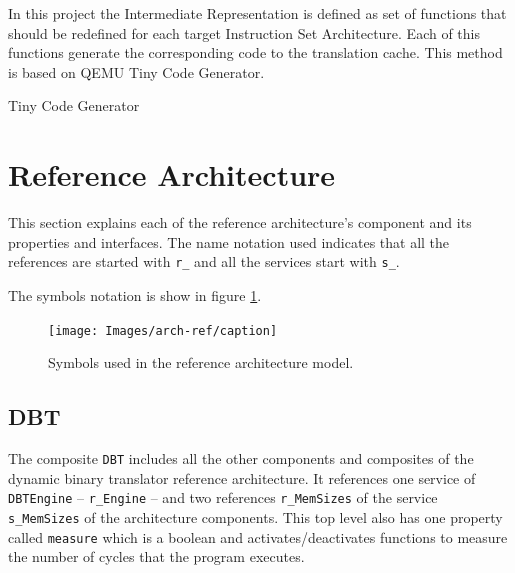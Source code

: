 \documentclass{report}
\begin{document}
	In this project the Intermediate Representation is defined as set of functions that should be redefined for each target Instruction Set Architecture. Each of this functions generate the corresponding code to the translation cache. This method is based on QEMU Tiny Code Generator.
	
	Tiny Code Generator
	

	
\newpage
	
	\section{Reference Architecture}
	
	\par This section explains each of the reference architecture's component and its properties and interfaces. The name notation used indicates that all the references are started with \texttt{r\_} and all the services start with \texttt{s\_}.
	\par The symbols notation is show in figure \ref{fig:caption}.
	
	\begin{figure} [H]
		\centering
		\texttt{[image: Images/arch-ref/caption]}
		\caption{Symbols used in the reference architecture model.}
		\label{fig:caption}
	\end{figure}

	
		\subsection{DBT}
		
		\par The composite \texttt{DBT} includes all the other components and composites of the dynamic binary translator reference architecture. It references one service of \texttt{DBTEngine} -- \texttt{r\_Engine} -- and two references \texttt{r\_MemSizes} of the service \texttt{s\_MemSizes} of the architecture components. This top level also has one property called \texttt{measure} which is a boolean and activates/deactivates functions to measure the number of cycles that the program executes.
		
\end{document}
